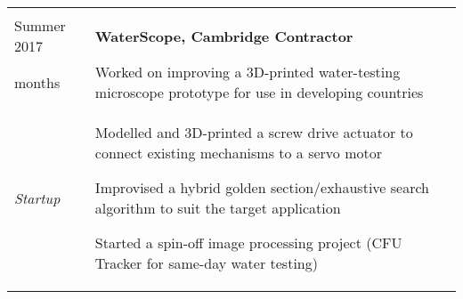 \documentclass[letterpaper, 10pt]{article}
\begin{document}
\begin{tabularx}{\linewidth}{>{\raggedleft}p{2.2cm}|X}
\begin{compact}
	\vspace{-.5\baselineskip}
\end{compact}\\
Summer 2017 & \textbf{WaterScope, Cambridge \hfill Contractor}\\
2 months & Worked on improving a 3D-printed water-testing microscope prototype for use in developing countries\\
\textit{Startup} &
\vspace{-.5\baselineskip}
\begin{compact}
	\item Modelled and 3D-printed a screw drive actuator to connect existing mechanisms to a servo motor
	\item Improvised a hybrid golden section/exhaustive search algorithm to suit the target application
    \item Started a spin-off image processing project (CFU Tracker for same-day water testing)
	\vspace{-\baselineskip}
\end{compact}
\end{tabularx}


\end{document}
